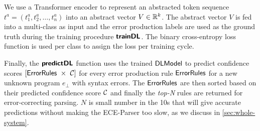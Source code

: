 %
We use a Transformer encoder to represent an abstracted token sequence $t^a =
(t^a_1, t^a_2, \dots, t^a_n)$ into an abstract vector $V \in \mathbb{R}^k$. The abstract
vector $V$ is fed into a multi-class \dnn as input and the error production
labels are used as the ground truth during the training procedure $\bm{\mathsf{trainDL}}$.
The binary cross-entropy loss function is used per class to assign the loss per
training cycle.

Finally, the $\bm{\mathsf{predictDL}}$ function uses the trained $\mathsf{DLModel}$ to predict
confidence scores $[\mathsf{ErrorRules}\ \times\ \mathcal{C}]$ for every error
production rule $\mathsf{ErrorRules}$ for a new unknown program $e_\bot$ with syntax
errors. The $\mathsf{ErrorRules}$ are then sorted based on their predicted confidence
score $\mathcal{C}$ and finally the \emph{top-N} rules are returned for
error-correcting parsing. $N$ is small number in the 10s that will give accurate
predictions without making the ECE-Parser too slow, as we discuss in
\autoref{sec:whole-system}.
